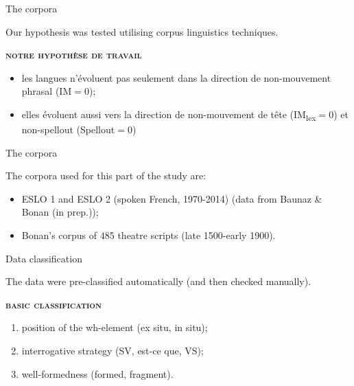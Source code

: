 \documentclass[lesson_slides]{subfiles}
\begin{document}
\begin{frame}[c]{The corpora}

    Our hypothesis was tested utilising corpus linguistics techniques. \pause

    \noindent \textbf{\textsc{notre hypothèse de travail}} \pause
    \begin{itemize}
        \item[\ding{227}] les langues n'évoluent pas seulement dans la direction de non-mouvement phrasal (IM$=$0); \pause
        \item[\ding{227}] elles évoluent aussi vers la direction de non-mouvement de tête (IM\textsubscript{lex}$=$0) et non-spellout (Spellout$=$0) 
    \end{itemize}
    
\end{frame}
\begin{frame}[c]{The corpora}

    \noindent The corpora used for this part of the study are: \pause

    \begin{itemize}
        \item[\ding{227}] \vspace*{-2mm} ESLO 1 and ESLO 2 (spoken French, 1970-2014) (data from Baunaz \& Bonan (in prep.)); \pause
        \item[\ding{227}] \vspace*{-2mm} Bonan's corpus of 485 theatre scripts (late 1500-early 1900).
    \end{itemize}
    
\end{frame}
\begin{frame}[c]{Data classification}

    \noindent The data were pre-classified automatically (and then checked manually). \pause

    \textbf{\textsc{basic classification}} \pause
    \begin{enumerate}
        \item position of the wh-element \pause (ex situ, in situ); \pause
        \item interrogative strategy \pause (SV, est-ce que, VS); \pause
        \item well-formedness \pause (formed, fragment). \pause
    \end{enumerate}
    
\end{frame}
\end{document}

